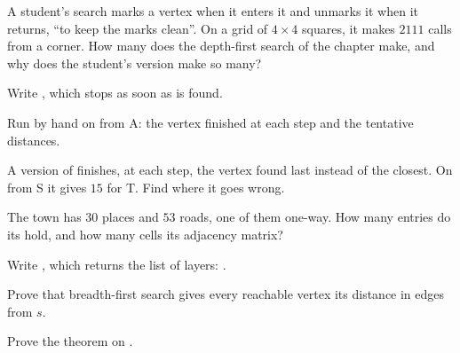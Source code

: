 \begin{exercise}[$\star\star$]\label{exo:g12:graph-algorithms:6}
A student's search marks a vertex when it enters it and unmarks it when it returns, ``to keep the marks clean''. On a
grid of $4 \times 4$ squares, it makes $2111$ calls from a corner. How many does the depth-first search of the chapter
make, and why does the student's version make so many?
\end{exercise}

\begin{exercise}[$\star\star$]\label{exo:g12:graph-algorithms:7}
Write , which stops as soon as  is found.
\end{exercise}

\begin{exercise}[$\star\star$]\label{exo:g12:graph-algorithms:8}
Run  by hand on  from A: the vertex finished at each step and the tentative distances.
\end{exercise}

\begin{exercise}[$\star\star$]\label{exo:g12:graph-algorithms:9}
A version of  finishes, at each step, the vertex found last instead of the closest. On 
from S it gives $15$ for T. Find where it goes wrong.
\end{exercise}

\begin{exercise}[$\star\star$]\label{exo:g12:graph-algorithms:10}
The town has $30$ places and $53$ roads, one of them one-way. How many entries do its  hold, and how
many cells its adjacency matrix?
\end{exercise}

\begin{exercise}[$\star\star$]\label{exo:g12:graph-algorithms:11}
Write , which returns the list of layers: .
\end{exercise}

\begin{exercise}[$\star\star\star$]\label{exo:g12:graph-algorithms:12}
Prove that breadth-first search gives every reachable vertex its distance in edges from $s$.
\end{exercise}

\begin{exercise}[$\star\star\star$]\label{exo:g12:graph-algorithms:13}
Prove the theorem on .
\end{exercise}

